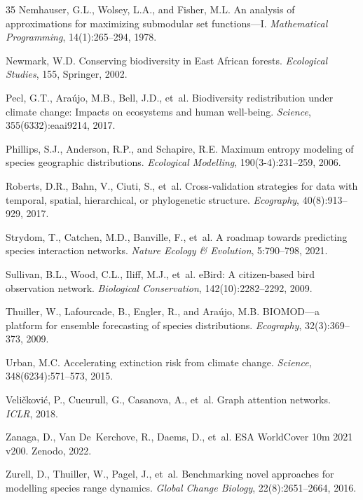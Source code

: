 \begin{thebibliography}{35}
Nemhauser, G.L., Wolsey, L.A., and Fisher, M.L.
\newblock An analysis of approximations for maximizing submodular set
  functions---I.
\newblock \emph{Mathematical Programming}, 14(1):265--294, 1978.

Newmark, W.D.
\newblock Conserving biodiversity in East African forests.
\newblock \emph{Ecological Studies}, 155, Springer, 2002.

Pecl, G.T., Ara{\'u}jo, M.B., Bell, J.D., et~al.
\newblock Biodiversity redistribution under climate change: Impacts on
  ecosystems and human well-being.
\newblock \emph{Science}, 355(6332):eaai9214, 2017.

Phillips, S.J., Anderson, R.P., and Schapire, R.E.
\newblock Maximum entropy modeling of species geographic distributions.
\newblock \emph{Ecological Modelling}, 190(3-4):231--259, 2006.

Roberts, D.R., Bahn, V., Ciuti, S., et~al.
\newblock Cross-validation strategies for data with temporal, spatial,
  hierarchical, or phylogenetic structure.
\newblock \emph{Ecography}, 40(8):913--929, 2017.

Strydom, T., Catchen, M.D., Banville, F., et~al.
\newblock A roadmap towards predicting species interaction networks.
\newblock \emph{Nature Ecology \& Evolution}, 5:790--798, 2021.

Sullivan, B.L., Wood, C.L., Iliff, M.J., et~al.
\newblock eBird: A citizen-based bird observation network.
\newblock \emph{Biological Conservation}, 142(10):2282--2292, 2009.

Thuiller, W., Lafourcade, B., Engler, R., and Ara{\'u}jo, M.B.
\newblock BIOMOD---a platform for ensemble forecasting of species distributions.
\newblock \emph{Ecography}, 32(3):369--373, 2009.

Urban, M.C.
\newblock Accelerating extinction risk from climate change.
\newblock \emph{Science}, 348(6234):571--573, 2015.

Veli{\v{c}}kovi{\'c}, P., Cucurull, G., Casanova, A., et~al.
\newblock Graph attention networks.
\newblock \emph{ICLR}, 2018.

Zanaga, D., Van De~Kerchove, R., Daems, D., et~al.
\newblock ESA WorldCover 10m 2021 v200.
\newblock Zenodo, 2022.

Zurell, D., Thuiller, W., Pagel, J., et~al.
\newblock Benchmarking novel approaches for modelling species range dynamics.
\newblock \emph{Global Change Biology}, 22(8):2651--2664, 2016.

\end{thebibliography}

\appendix
